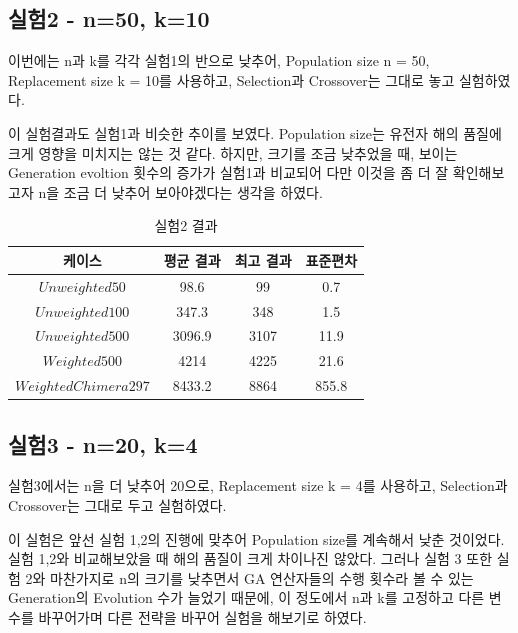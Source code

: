 \documentclass{article}
\begin{document}
\subsection{실험2 - n=50, k=10}

이번에는 n과 k를 각각 실험1의 반으로 낮추어, Population size n = 50, Replacement size k = 10를 사용하고, Selection과 Crossover는 그대로 놓고 실험하였다.

이 실험결과도 실험1과 비슷한 추이를 보였다. Population size는 유전자 해의 품질에 크게 영향을 미치지는 않는 것 같다. 하지만, 크기를 조금 낮추었을 때, 보이는 Generation evoltion 횟수의 증가가 실험1과 비교되어 다만 이것을 좀 더 잘 확인해보고자 n을 조금 더 낮추어 보아야겠다는 생각을 하였다.



 \begin{table}[h]
 \begin{center}
\caption{실험2 결과}
\begin{tabular}{cccc}
\hline\hline
케이스 & 평균 결과 & 최고 결과 & 표준편차\\
\hline\hline
$Unweighted 50$ & 98.6 & 99 & 0.7\\
\hline
$Unweighted 100$ & 347.3 & 348 & 1.5\\
\hline
$Unweighted 500$ & 3096.9 & 3107 & 11.9\\
\hline
$Weighted 500$ & 4214 & 4225 & 21.6\\
\hline
$Weighted Chimera 297$ & 8433.2 & 8864 & 855.8\\
\hline
\end{tabular}
\end{center}
\end{table}


\subsection{실험3 - n=20, k=4}

실험3에서는 n을 더 낮추어 20으로, Replacement size k = 4를 사용하고, Selection과 Crossover는 그대로 두고 실험하였다.

이 실험은 앞선 실험 1,2의 진행에 맞추어 Population size를 계속해서 낮춘 것이었다. 실험 1,2와 비교해보았을 때 해의 품질이 크게 차이나진 않았다. 그러나 실험 3 또한 실험 2와 마찬가지로 n의 크기를 낮추면서 GA 연산자들의 수행 횟수라 볼 수 있는 Generation의 Evolution 수가 늘었기 때문에, 이 정도에서 n과 k를 고정하고 다른 변수를 바꾸어가며 다른 전략을 바꾸어 실험을 해보기로 하였다.
\end{document}
